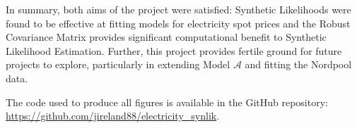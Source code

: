 In summary, both aims of the project were satisfied: Synthetic Likelihoods were found to be effective at fitting models for electricity spot prices and the Robust Covariance Matrix provides significant computational benefit to Synthetic Likelihood Estimation. Further, this project provides fertile ground for future projects to explore, particularly in extending Model $\mathcal{A}$ and fitting the Nordpool data.

The code used to produce all figures is available in the GitHub repository: \url{https://github.com/jireland88/electricity_synlik}.
